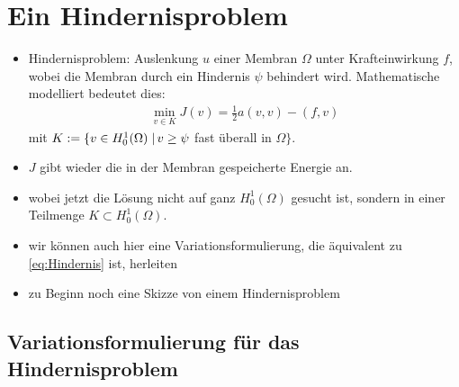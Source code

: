 
\section{Ein Hindernisproblem}

\begin{itemize}
\item Hindernisproblem: Auslenkung $u$ einer Membran $\Omega$ unter Krafteinwirkung $f$, wobei die Membran durch ein Hindernis $\psi$ behindert wird. Mathematische modelliert bedeutet dies:
\begin{align}\label{eq:Hindernis}
\min_{v\in K} J(v) = \frac 1 2 a(v,v)-(f,v)
\end{align}
mit $K := \{v \in H^1_0(\Omega) \;\vert\, v\ge \psi$ fast überall in $\Omega\}$. 

\item $J$ gibt wieder die in der Membran gespeicherte Energie an.
\item wobei jetzt die Lösung nicht auf ganz $H^1_0(\Omega)$ gesucht ist, sondern in einer Teilmenge $K \subset H^1_0(\Omega)$.

\item wir können auch hier eine Variationsformulierung, die äquivalent zu \eqref{eq:Hindernis} ist, herleiten

\item zu Beginn noch eine Skizze von einem Hindernisproblem

\end{itemize}



\subsection{Variationsformulierung für das Hindernisproblem}

